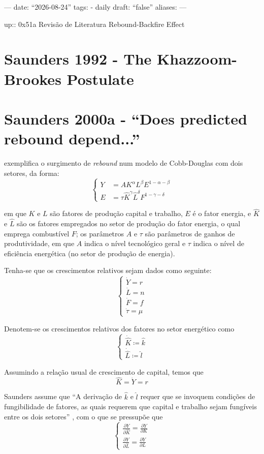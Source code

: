 ---
date: ``2026-08-24''
tags:
  - daily
draft: ``false''
aliases:
---

up:: 0x51a Revisão de Literatura Rebound-Backfire Effect

\section{Saunders 1992 - The Khazzoom-Brookes Postulate}

\section{Saunders 2000a - ``Does predicted rebound depend...''}
\textcite{Saunders2000} exemplifica o surgimento de \textit{rebound} num modelo de Cobb-Douglas com dois setores, da forma:
$$
\begin{cases}
Y&=A K^{\alpha}L^{\beta}E^{1-\alpha-\beta} \\
E&=\tau \hat{K}^{\gamma}\hat{L}^{\delta}F^{1-\gamma-\delta}
\end{cases}
$$

em que $K$ e $L$ são fatores de produção capital e trabalho, $E$ é o fator energia, e $\hat{K}$ e $\hat{L}$ são os fatores empregados no setor de produção do fator energia, o qual emprega combustível $F$; os parâmetros $A$ e $\tau$ são parâmetros de ganhos de produtividade, em que $A$ indica o nível tecnológico geral e $\tau$ indica o nível de eficiência energética (no setor de produção de energia). 

Tenha-se que os crescimentos relativos sejam dados como seguinte:
$$
\begin{cases}
\dot{Y}=r \\
\dot{L}=n \\
\dot{F} = f  \\
\dot{\tau} = \mu
\end{cases}
$$

Denotem-se os crescimentos relativos dos fatores no setor energético como
$$
\begin{cases}
\dot{\hat{K}} \coloneqq \hat{k} \\
\dot{\hat{L}} \coloneqq \hat{l}
\end{cases}
$$

Assumindo a relação usual de crescimento de capital, temos que 
$$
\hat{K}=\dot{Y}=r
$$

Saunders assume que ``A derivação de $\hat{k}$ e $\hat{l}$ requer que se invoquem condições de fungibilidade de fatores, as quais requerem que capital e trabalho sejam fungíveis entre os dois setores'' \parencite[p. 499]{Saunders2000}, com o que se pressupõe que
$$
\begin{cases}
\frac{ \partial Y }{ \partial \hat{K} }  = \frac{ \partial Y }{ \partial K } \\
\frac{ \partial Y }{ \partial \hat{L} } = \frac{ \partial Y }{ \partial L }  
\end{cases}
$$

